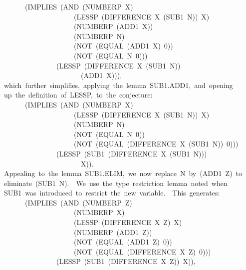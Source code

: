 \documentclass[11pt]{book}
\newenvironment{pubasis}{\begin{flushleft}\ttfamily\small}{\normalsize\rmfamily\end{flushleft}}
\begin{document}
\begin{pubasis}
~~~~~~~~(IMPLIES~(AND~(NUMBERP~X)\\
~~~~~~~~~~~~~~~~~~~~~~(LESSP~(DIFFERENCE~X~(SUB1~N))~X)\\
~~~~~~~~~~~~~~~~~~~~~~(NUMBERP~(ADD1~X))\\
~~~~~~~~~~~~~~~~~~~~~~(NUMBERP~N)\\
~~~~~~~~~~~~~~~~~~~~~~(NOT~(EQUAL~(ADD1~X)~0))\\
~~~~~~~~~~~~~~~~~~~~~~(NOT~(EQUAL~N~0)))\\
~~~~~~~~~~~~~~~~~(LESSP~(DIFFERENCE~X~(SUB1~N))\\
~~~~~~~~~~~~~~~~~~~~~~~~(ADD1~X))),\\

~~which~further~simplifies,~applying~the~lemma~SUB1.ADD1,~and~opening\\
~~up~the~definition~of~LESSP,~to~the~conjecture:\\

~~~~~~~~(IMPLIES~(AND~(NUMBERP~X)\\
~~~~~~~~~~~~~~~~~~~~~~(LESSP~(DIFFERENCE~X~(SUB1~N))~X)\\
~~~~~~~~~~~~~~~~~~~~~~(NUMBERP~N)\\
~~~~~~~~~~~~~~~~~~~~~~(NOT~(EQUAL~N~0))\\
~~~~~~~~~~~~~~~~~~~~~~(NOT~(EQUAL~(DIFFERENCE~X~(SUB1~N))~0)))\\
~~~~~~~~~~~~~~~~~(LESSP~(SUB1~(DIFFERENCE~X~(SUB1~N)))\\
~~~~~~~~~~~~~~~~~~~~~~~~X)).\\

~~Appealing~to~the~lemma~SUB1.ELIM,~we~now~replace~N~by~(ADD1~Z)~to\\
~~eliminate~(SUB1~N).~~We~use~the~type~restriction~lemma~noted~when\\
~~SUB1~was~introduced~to~restrict~the~new~variable.~~This~generates:\\

~~~~~~~~(IMPLIES~(AND~(NUMBERP~Z)\\
~~~~~~~~~~~~~~~~~~~~~~(NUMBERP~X)\\
~~~~~~~~~~~~~~~~~~~~~~(LESSP~(DIFFERENCE~X~Z)~X)\\
~~~~~~~~~~~~~~~~~~~~~~(NUMBERP~(ADD1~Z))\\
~~~~~~~~~~~~~~~~~~~~~~(NOT~(EQUAL~(ADD1~Z)~0))\\
~~~~~~~~~~~~~~~~~~~~~~(NOT~(EQUAL~(DIFFERENCE~X~Z)~0)))\\
~~~~~~~~~~~~~~~~~(LESSP~(SUB1~(DIFFERENCE~X~Z))~X)),\\


\end{pubasis}
\end{document}
